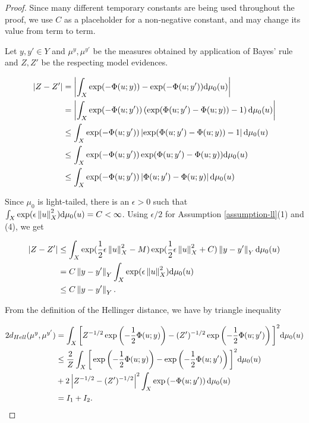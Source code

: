 \begin{proof}
  Since many different temporary constants are being used throughout the proof, we use $C$ as a placeholder for a non-negative constant, and may change its value from term to term.

  Let $y, y' \in Y$ and  $\mu^y, \mu^{y'}$ be the measures obtained by application of Bayes' rule and $Z, Z'$ be the respecting model evidences.

  \begin{equation*}
    \begin{aligned}
      |Z - Z'|
      &= \left|\int_X \exp(-\Phi(u; y)) - \exp(-\Phi(u; y'))  \text{d} \mu_0(u)\right|\\
      &= \left|\int_X \exp(-\Phi(u; y'))\left(\exp(\Phi(u; y')-\Phi(u; y)) - 1\right)  \text{d} \mu_0(u)\right|\\
      &\le \int_X \exp(-\Phi(u; y'))\left|\exp(\Phi(u; y')-\Phi(u; y)) - 1\right| \text{d} \mu_0(u)\\
      &\le \int_X \exp(-\Phi(u; y'))\exp(\Phi(u; y')-\Phi(u; y)) \text{d} \mu_0(u)\\
      &\le \int_X \exp(-\Phi(u; y'))\left|\Phi(u; y')-\Phi(u; y)\right| \text{d} \mu_0(u)
    \end{aligned}
  \end{equation*}

  Since $\mu_0$ is light-tailed, there is an $\epsilon > 0$ such that $\int_X\exp(\epsilon \left\lVert u\right\rVert_X^2)\text{d} \mu_0(u) = C < \infty$. Using $\epsilon / 2$ for Assumption \ref{assumption-ll}(1) and (4), we get

  \begin{equation}\label{bound-z}
    \begin{aligned}
      |Z - Z'|
      &\le \int_X \exp(\frac12\epsilon\left\lVert u\right\rVert_X^2 - M)\exp(\frac12\epsilon\left\lVert u\right\rVert_X^2 + C)\left\lVert y - y'\right\rVert_Y \text{d}\mu_0(u) \\
      &= C  \left\lVert y - y'\right\rVert_Y \int_X \exp(\epsilon\left\lVert u\right\rVert_X^2) \text{d}\mu_0(u)\\
      &\le C\left\lVert y - y'\right\rVert_Y.
      \end{aligned}
  \end{equation}

  From the definition of the Hellinger distance, we have by triangle inequality

  \begin{equation*}
    \begin{aligned}
      2d_{Hell}(\mu^y, \mu^{y'}) &= \int_X\bigg[Z^{-1/2}\exp\left(-\frac12\Phi(u;y)\right) - (Z')^{-1/2}\exp\left(-\frac12\Phi(u; y')\right)\bigg]^2\text{d}\mu_0(u)\\
      &\le \frac2Z\int_X\bigg[\exp\left(-\frac12\Phi(u;y)\right) - \exp\left(-\frac12\Phi(u; y')\right)\bigg]^2\text{d}\mu_0(u)\\
      &+ 2\left|Z^{-1/2} - (Z')^{-1/2}\right|^2\int_X\exp\left(-\Phi(u; y')\right)\text{d}\mu_0(u)\\
      &= I_1 + I_2.
    \end{aligned}
  \end{equation*}
  

\end{proof}
